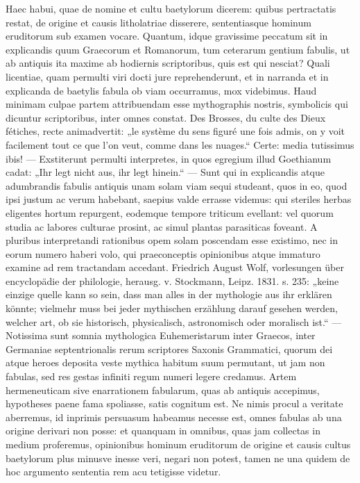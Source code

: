 \documentclass[a4paper, 11pt, oneside, polutonikogreek, german]{article}
\begin{document}
Haec habui, quae de nomine et cultu baetylorum dicerem: quibus pertractatis restat, de origine et causis litholatriae disserere, sententiasque hominum eruditorum sub examen vocare. Quantum, idque gravissime peccatum sit in explicandis quum Graecorum et Romanorum, tum ceterarum gentium fabulis, ut ab antiquis ita maxime ab hodiernis scriptoribus, quis est qui nesciat? Quali licentiae, quam permulti viri docti jure reprehenderunt, et in narranda et in explicanda de baetylis fabula ob viam occurramus, mox videbimus. Haud minimam culpae partem attribuendam esse mythographis nostris, symbolicis qui dicuntur scriptoribus, inter omnes constat. Des Brosses, du culte des Dieux fétiches, recte animadvertit: „le système du sens figuré une fois admis, on y voit facilement tout ce que l'on veut, comme dans les nuages.“ Certe: media tutissimus ibis! --- Exstiterunt permulti interpretes, in quos egregium illud Goethianum cadat: „Ihr legt nicht aus, ihr legt hinein.“ --- Sunt qui in explicandis atque adumbrandis fabulis antiquis unam solam viam sequi studeant, quos in eo, quod ipsi justum ac verum habebant, saepius valde errasse videmus: qui steriles herbas eligentes hortum repurgent, eodemque tempore triticum evellant: vel quorum studia ac labores culturae prosint, ac simul plantas parasiticas foveant. A pluribus interpretandi rationibus opem solam poscendam esse existimo, nec in eorum numero haberi volo, qui praeconceptis opinionibus atque immaturo examine ad rem tractandam accedant. Friedrich August Wolf, vorlesungen über encyclopädie der philologie, herausg. v. Stockmann, Leipz. 1831. s. 235: „keine einzige quelle kann so sein, dass man alles in der mythologie aus ihr erklären könnte; vielmehr muss bei jeder mythischen erzählung darauf gesehen werden, welcher art, ob sie historisch, physicalisch, astronomisch oder moralisch ist.“ --- Notissima sunt somnia mythologica Euhemeristarum inter Graecos, inter Germaniae septentrionalis rerum scriptores Saxonis Grammatici, quorum dei atque heroes deposita veste mythica habitum suum permutant, ut jam non fabulas, sed res gestas infiniti regum numeri legere credamus. Artem hermeneuticam sive enarrationem fabularum, quas ab antiquis accepimus, hypotheses paene fama spoliasse, satis cognitum est. Ne nimis procul a veritate aberremus, id inprimis persuasum habeamus necesse est, omnes fabulas ab una origine derivari non posse: et quanquam in omnibus, quas jam collectas in medium proferemus, opinionibus hominum eruditorum de origine et causis cultus baetylorum plus minusve inesse veri, negari non potest, tamen ne una quidem de hoc argumento sententia rem acu tetigisse videtur.
\end{document}
